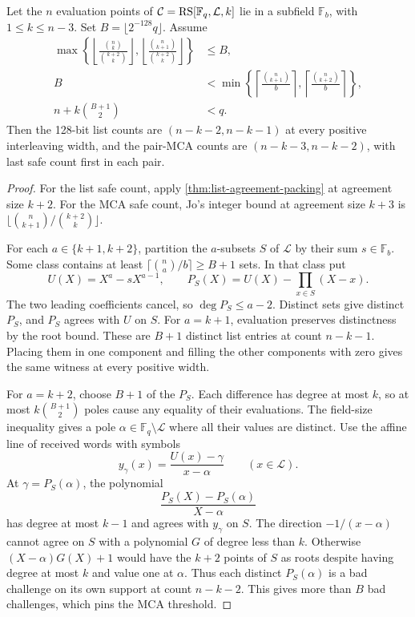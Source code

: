 \begin{proposition}
\label{prop:subfield-crossings}
Let the \(n\) evaluation points of \(\mathcal C=\operatorname{RS}[\mathbb F_q,\mathcal L,k]\)
lie in a subfield \(\mathbb F_b\), with \(1\le k\le n-3\). Set
\(B=\lfloor 2^{-128}q\rfloor\). Assume
\begin{align*}
 \max\left\{\left\lfloor\frac{\binom nk}{\binom{k+2}k}\right\rfloor,
 \left\lfloor\frac{\binom n{k+1}}{\binom{k+2}k}\right\rfloor\right\}
     &\le B,\\
 B&<\min\left\{\left\lceil\frac{\binom n{k+1}}b\right\rceil,
 \left\lceil\frac{\binom n{k+2}}b\right\rceil\right\},\\
 n+k\binom{B+1}{2}&<q.
\end{align*}
Then the 128-bit list counts are \((n-k-2,n-k-1)\) at every positive
interleaving width, and the pair-MCA counts are \((n-k-3,n-k-2)\), with
last safe count first in each pair.
\end{proposition}

\begin{proof}
For the list safe count, apply \cref{thm:list-agreement-packing} at
agreement size \(k+2\). For the MCA safe count, Jo's integer bound at
agreement size \(k+3\) is
\(\lfloor\binom n{k+1}/\binom{k+2}k\rfloor\).

For each \(a\in\{k+1,k+2\}\), partition the \(a\)-subsets \(S\) of
\(\mathcal L\) by their sum \(s\in\mathbb F_b\). Some class contains at
least \(\lceil\binom na/b\rceil\ge B+1\) sets. In that class put
\[
 U(X)=X^a-sX^{a-1},\qquad
 P_S(X)=U(X)-\prod_{x\in S}(X-x).
\]
The two leading coefficients cancel, so \(\deg P_S\le a-2\). Distinct
sets give distinct \(P_S\), and \(P_S\) agrees with \(U\) on \(S\).
For \(a=k+1\), evaluation preserves distinctness by the root bound.
These are \(B+1\) distinct list entries at count
\(n-k-1\). Placing them in one component and filling the other components
with zero gives the same witness at every positive width.

For \(a=k+2\), choose \(B+1\) of the \(P_S\). Each difference has degree
at most \(k\), so at most \(k\binom{B+1}{2}\) poles cause any equality of
their evaluations. The field-size inequality gives a pole
\(\alpha\in\mathbb F_q\setminus\mathcal L\) where all their values are
distinct. Use the affine line of received words with symbols
\[
 y_\gamma(x)=\frac{U(x)-\gamma}{x-\alpha}
 \qquad(x\in\mathcal L).
\]
At \(\gamma=P_S(\alpha)\), the polynomial
\[
 \frac{P_S(X)-P_S(\alpha)}{X-\alpha}
\]
has degree at most \(k-1\) and agrees with \(y_\gamma\) on \(S\).
The direction \(-1/(x-\alpha)\) cannot agree on \(S\) with a polynomial
\(G\) of degree less than \(k\). Otherwise \((X-\alpha)G(X)+1\) would
have the \(k+2\) points of \(S\) as roots despite having degree at most
\(k\) and value one at \(\alpha\). Thus each distinct \(P_S(\alpha)\)
is a bad challenge on its own support at count \(n-k-2\). This gives
more than \(B\) bad challenges, which pins the MCA threshold.
\end{proof}

